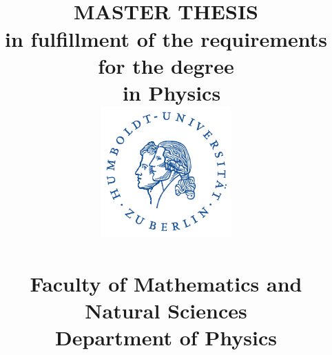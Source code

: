 \author{ }%

\title{ \vspace{-1cm}
\dctitle \\
\vspace{0.5cm}
\vspace{0.5cm} 
\Large{MASTER THESIS}\\
	\vspace{1cm} 
\Large{in fulfillment of the requirements for the degree \\
\dcdegree~in Physics \\ \vspace{0.5cm}}
\includegraphics[width=5cm]{husiegel}\\
\vspace{0.5cm} %
 \large{ 
\dcuniversity \\
Faculty of Mathematics and Natural Sciences \\
Department of Physics\\
}}
